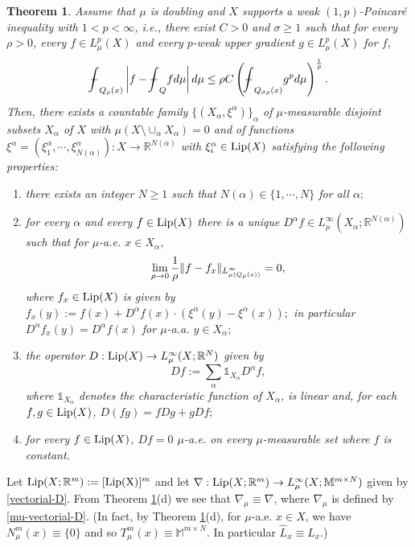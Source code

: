 \documentclass[10pt]{amsart}
\numberwithin{equation}{section}
\newtheorem{theorem}{Theorem}[section]
\theoremstyle{definition}
\theoremstyle{remark}
\begin{document}
\begin{theorem}\label{cheeger-theorem}
Assume that $\mu$ is doubling and $X$ supports a weak $(1,p)$-Poincar\'e inequality with $1<p<\infty$, i.e., there exist $C>0$ and $\sigma\geq 1$ such that for every $\rho>0$, every $f\in L^p_\mu(X)$ and every $p$-weak upper gradient $g\in L^p_\mu(X)$ for $f$,
$$
{{{\bf-}\!\!\!\!\!\!\hspace{-.1em}\int}}_{Q_\rho(x)}\left|f-{{{\bf-}\!\!\!\!\!\!\hspace{-.1em}\int}}_Q f d\mu\right|d\mu\leq \rho C\left({{{\bf-}\!\!\!\!\!\!\hspace{-.1em}\int}}_{Q_{\sigma \rho}(x)} g^p d\mu\right)^{1\over p}.
$$
Then, there exists a countable family $\{(X_\alpha,\xi^\alpha)\}_\alpha$ of $\mu$-measurable disjoint subsets $X_\alpha$ of $X$ with $\mu(X\setminus\cup_\alpha X_\alpha)=0$ and of functions $\xi^\alpha=(\xi^\alpha_1,\cdots,\xi^\alpha_{N(\alpha)}):X\to{{\mathbb R}}^{N(\alpha)}$ with $\xi^\alpha_i\in {\rm Lip}(X)$ satisfying the following properties{\rm:}
\begin{enumerate}[label={\rm(\alph*)}]
\item  there exists an integer $N\geq 1$ such that $N(\alpha)\in\{1,\cdots, N\}$ for all $\alpha;$
\item for every $\alpha$ and every $f\in{\rm Lip}(X)$ there is a unique $D^\alpha f\in L^\infty_\mu(X_\alpha;{{\mathbb R}}^{N(\alpha)})$ such that for $\mu$-a.e. $x\in X_\alpha$,
$$
\lim_{\rho\to 0}{1\over\rho}\|f-f_x\|_{L^\infty_{\mu(Q_\rho(x))}}=0,
$$
where $f_x\in {\rm Lip}(X)$ is given by $f_x(y):=f(x)+D^\alpha f(x)\cdot(\xi^\alpha(y)-\xi^\alpha(x));$ in particular $D^\alpha f_x(y)=D^\alpha f(x)$ for $\mu$-a.a. $y\in X_\alpha;$
\item the operator $D:{\rm Lip}(X)\to L^\infty_\mu(X;{{\mathbb R}}^N)$ given by
$$
Df:=\sum_\alpha \mathds{1}_{X_\alpha}D^\alpha f,
$$
where $\mathds{1}_{X_\alpha}$ denotes the characteristic function of $X_\alpha$, is linear and, for each $f,g\in{\rm Lip}(X)$, $D(fg)=fDg+gDf;$
\item for every $f\in{\rm Lip}(X)$, $Df=0$ $\mu$-a.e. on every $\mu$-measurable set where $f$ is constant.\end{enumerate}
\end{theorem}

Let ${\rm Lip}(X;{{\mathbb R}}^m):=[{\rm Lip(X)}]^m$ and let $\nabla:{\rm Lip}(X;{{\mathbb R}}^m)\to L^\infty_\mu(X;{{\mathbb M}^{m\times N}})$ given by \eqref{vectorial-D}. From Theorem \ref{cheeger-theorem}(d) we see that $\nabla_\mu\equiv\nabla$, where $\nabla_\mu$ is defined by \eqref{mu-vectorial-D}. (In fact, by Theorem \ref{cheeger-theorem}(d), for $\mu$-a.e. $x\in X$, we have $N_\mu^m(x)\equiv\{0\}$ and so $T_\mu^m(x)\equiv\mathbb{M}^{m\times N}$. In particular $\widehat{L}_x\equiv L_x$.) 
\end{document}

